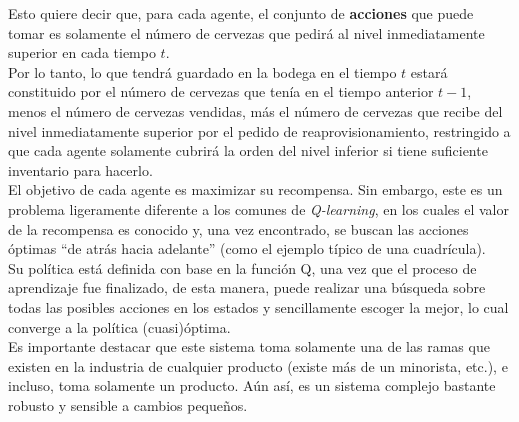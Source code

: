 Esto quiere decir que, para cada agente, el conjunto de \textbf{acciones} que puede tomar es solamente el n\'umero de cervezas que pedir\'a al nivel inmediatamente superior en cada tiempo $t$. \\

Por lo tanto, lo que tendr\'a guardado en la bodega en el tiempo $t$ estar\'a constituido por el n\'umero de cervezas que ten\'ia en el tiempo anterior $t-1$, menos el n\'umero de cervezas vendidas, m\'as el n\'umero de cervezas que recibe del nivel inmediatamente superior por el pedido de reaprovisionamiento, restringido a que cada agente solamente cubrir\'a la orden del nivel inferior si tiene suficiente inventario para hacerlo.\\

El objetivo de cada agente es maximizar su recompensa. Sin embargo, este es un problema ligeramente diferente a los comunes de \textit{Q-learning}, en los cuales el valor de la recompensa es conocido y, una vez encontrado, se buscan las acciones \'optimas ``de atr\'as hacia adelante'' (como el ejemplo t\'ipico de una cuadr\'icula).\\

Su pol\'itica est\'a definida con base en la funci\'on Q, una vez que el proceso de aprendizaje fue finalizado, de esta manera, puede realizar una b\'usqueda sobre todas las posibles acciones en los estados y sencillamente escoger la mejor, lo cual converge a la pol\'itica (cuasi)\'optima. \\

Es importante destacar que este sistema toma solamente una de las ramas que existen en la industria de cualquier producto (existe m\'as de un minorista, etc.), e incluso, toma solamente un producto. A\'un as\'i, es un sistema complejo bastante robusto y sensible a cambios peque\~nos.

